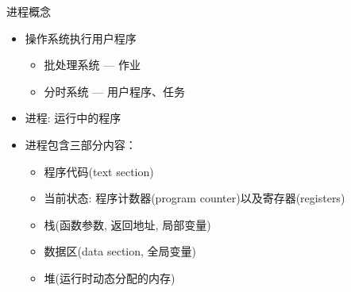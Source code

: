 \documentclass[xcolor=svgnames]{beamer}
\begin{document}
\begin{CJK*}{UTF8}{gbsn}
\begin{frame}{进程概念}
\begin{itemize}
\item 操作系统执行用户程序
\begin{itemize}
\item 批处理系统 --- 作业
\item 分时系统 --- 用户程序、任务
\end{itemize}
\item 进程: 运行中的程序 
\item 进程包含三部分内容：
\begin{itemize}
\item 程序代码(text section)
\item 当前状态: 程序计数器(program counter)以及寄存器(registers)
\item 栈(函数参数, 返回地址, 局部变量)
\item 数据区(data section, 全局变量)
\item 堆(运行时动态分配的内存)
\end{itemize}
\end{itemize}
\end{frame}


\end{CJK*}
\end{document}
